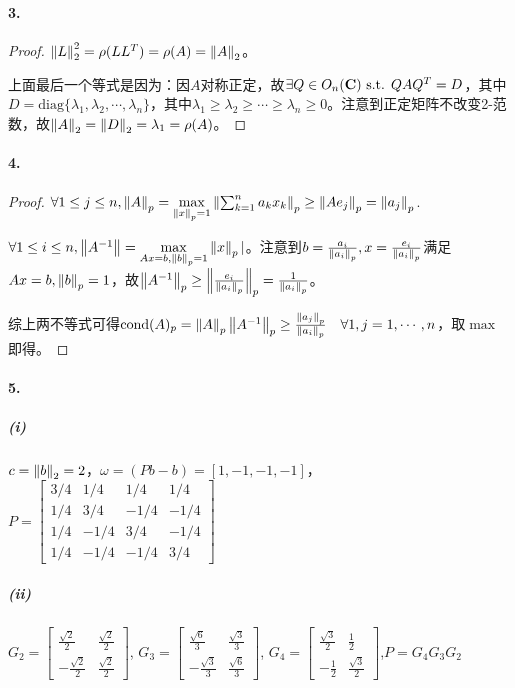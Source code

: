 \documentclass{ctexart}
\begin{document}
\paragraph{3.}
\begin{proof}
$\left\|L\right\|^2_2=\rho(LL^T)=\rho(A)=\left\|A\right\|_2$。

上面最后一个等式是因为：因$A$对称正定，故$\exists Q\in O_n(\mathbf{C})\text{ s.t. } QAQ^T=D$，其中$D=\mathrm{diag}\{\lambda_1,\lambda_2,\cdots,\lambda_n\}$，其中$\lambda_1\geq \lambda_2\geq\cdots\geq\lambda_n\geq 0$。注意到正定矩阵不改变2-范数，故$\left\|A\right\|_2=\left\|D\right\|_2=\lambda_1=\rho(A)$。
\end{proof}

\paragraph{4.}
\begin{proof}
$\forall 1\leq j\leq n, \left\|A\right\|_p=\max\limits_{\left\|x\right\|_p=1}\left\|\sum_{k=1}^n a_kx_k\right\|_p\geq \left\|Ae_j\right\|_p=\left\|a_j\right\|_p$.

$\forall 1\leq i\leq n, \left\|A^{-1}\right\|=\max\limits_{Ax=b,\left\|b\right\|_p=1}\left\|x\right\|_p|$。注意到$b=\frac{a_i}{\left\|a_i\right\|_p},x=\frac{e_i}{\left\|a_i\right\|_p}$满足$Ax=b, \left\|b\right\|_p=1$，故$\left\|A^{-1}\right\|_p\geq\left\|\frac{e_i}{\left\|a_i\right\|_p}\right\|_p=\frac{1}{\left\|a_i\right\|_p}$。

综上两不等式可得$\mathrm{cond}(A)_p=\left\|A\right\|_p\left\|A^{-1}\right\|_p\geq \frac{\left\|a_j\right\|_p}{\left\|a_i\right\|_p}\quad \forall 1,j=1,\cdots,n$，取$\max$即得。
\end{proof}

\paragraph{5.}
\subparagraph{(i)}
$c=\left\|b\right\|_2=2$，$\omega=(Pb-b)=[1,-1,-1,-1]$，$P=\begin{bmatrix}3/4&1/4&  1/4&  1/4\\
1/4&  3/4& -1/4& -1/4\\
1/4& -1/4&  3/4& -1/4\\
1/4& -1/4& -1/4&  3/4\end{bmatrix}$
\subparagraph{(ii)}
$G_2=\begin{bmatrix}\frac{\sqrt{2}}{2}&\frac{\sqrt{2}}{2}\\-\frac{\sqrt{2}}{2}&\frac{\sqrt{2}}{2}\end{bmatrix}$,
$G_3=\begin{bmatrix}\frac{\sqrt{6}}{3}&\frac{\sqrt{3}}{3}\\-\frac{\sqrt{3}}{3}&\frac{\sqrt{6}}{3}\end{bmatrix}$,
$G_4=\begin{bmatrix}\frac{\sqrt{3}}{2}&\frac 1 2\\-\frac 1 2&\frac{\sqrt{3}}{2}\end{bmatrix}$,$P=G_4G_3G_2$
\end{document}
